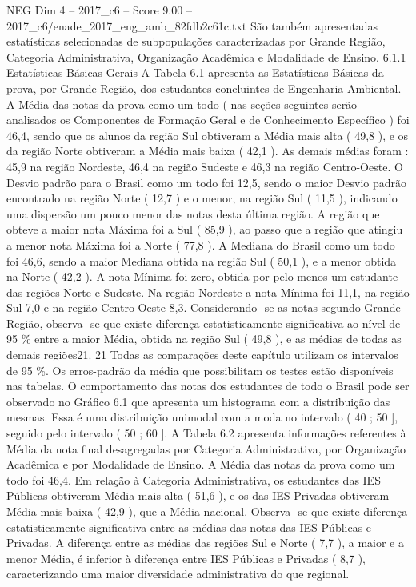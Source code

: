\begin{textsample}{NEG Dim 4 – 2017\_c6 – Score 9.00 – 2017\_c6/enade\_2017\_eng\_amb\_82fdb2c61c.txt}
São também apresentadas estatísticas selecionadas de subpopulações caracterizadas por Grande Região, Categoria Administrativa, Organização Acadêmica e Modalidade de Ensino. 6.1.1 Estatísticas Básicas Gerais A Tabela 6.1 apresenta as Estatísticas Básicas da prova, por Grande Região, dos estudantes concluintes de Engenharia Ambiental.
A Média das notas da prova como um todo ( nas seções seguintes serão analisados os Componentes de Formação Geral e de Conhecimento Específico ) foi 46,4, sendo que os alunos da região Sul obtiveram a Média mais alta ( 49,8 ), e os da região Norte obtiveram a Média mais baixa ( 42,1 ).
As demais médias foram : 45,9 na região Nordeste, 46,4 na região Sudeste e 46,3 na região Centro-Oeste.
O Desvio padrão para o Brasil como um todo foi 12,5, sendo o maior Desvio padrão encontrado na região Norte ( 12,7 ) e o menor, na região Sul ( 11,5 ), indicando uma dispersão um pouco menor das notas desta última região.
A região que obteve a maior nota Máxima foi a Sul ( 85,9 ), ao passo que a região que atingiu a menor nota Máxima foi a Norte ( 77,8 ).
A Mediana do Brasil como um todo foi 46,6, sendo a maior Mediana obtida na região Sul ( 50,1 ), e a menor obtida na Norte ( 42,2 ).
A nota Mínima foi zero, obtida por pelo menos um estudante das regiões Norte e Sudeste.
Na região Nordeste a nota Mínima foi 11,1, na região Sul 7,0 e na região Centro-Oeste 8,3.
Considerando -se as notas segundo Grande Região, observa -se que existe diferença estatisticamente significativa ao nível de 95 \% entre a maior Média, obtida na região Sul ( 49,8 ), e as médias de todas as demais regiões21. 21 Todas as comparações deste capítulo utilizam os intervalos de 95 \%.
Os erros-padrão da média que possibilitam os testes estão disponíveis nas tabelas.
O comportamento das notas dos estudantes de todo o Brasil pode ser observado no Gráfico 6.1 que apresenta um histograma com a distribuição das mesmas.
Essa é uma distribuição unimodal com a moda no intervalo ( 40 ; 50 ], seguido pelo intervalo ( 50 ; 60 ].
A Tabela 6.2 apresenta informações referentes à Média da nota final desagregadas por Categoria Administrativa, por Organização Acadêmica e por Modalidade de Ensino.
A Média das notas da prova como um todo foi 46,4.
Em relação à Categoria Administrativa, os estudantes das IES Públicas obtiveram Média mais alta ( 51,6 ), e os das IES Privadas obtiveram Média mais baixa ( 42,9 ), que a Média nacional.
Observa -se que existe diferença estatisticamente significativa entre as médias das notas das IES Públicas e Privadas.
A diferença entre as médias das regiões Sul e Norte ( 7,7 ), a maior e a menor Média, é inferior à diferença entre IES Públicas e Privadas ( 8,7 ), caracterizando uma maior diversidade administrativa do que regional.

\end{textsample}
